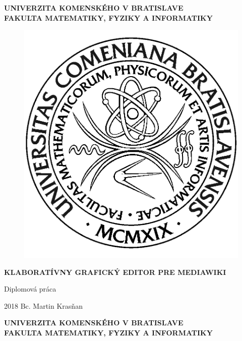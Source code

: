 \documentclass[12pt, a4paper, oneside]{book}
\newcommand\mftitle{Klaboratívny grafický editor pre MediaWiki}
\newcommand\mfthesistype{Diplomová práca}
\newcommand\mfauthor{Bc. Martin Krasňan}
\newcommand\mfuniversity{UNIVERZITA KOMENSKÉHO V BRATISLAVE}
\newcommand\mffaculty{FAKULTA MATEMATIKY, FYZIKY A INFORMATIKY}
\begin{document}
\frontmatter
\setcounter{page}{3}
\setcounter{secnumdepth}{2}

\thispagestyle{empty}

\noindent
\begin{minipage}{\textwidth}
\begin{center}
\textbf{\mfuniversity \\
\mffaculty}
\end{center}
\end{minipage}

\vfill
\begin{figure}[!hbt]
	\begin{center}
		\includegraphics{images/base/logo_fmph}
		\label{img:logo}
	\end{center}
\end{figure}
\begin{center}
	\begin{minipage}{0.8\textwidth}
		\centerline{\textbf{\Large\MakeUppercase{\mftitle}}}
		\smallskip
		\centerline{\mfthesistype}
	\end{minipage}
\end{center}
\vfill
2018 \hfill
\mfauthor
\eject 

\thispagestyle{empty}

\noindent
\begin{minipage}{\textwidth}
	\begin{center}
		\textbf{\mfuniversity \\
			\mffaculty}
	\end{center}
\end{minipage}
\end{document}
